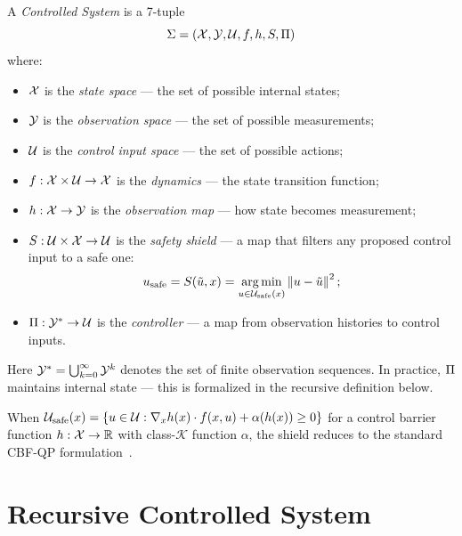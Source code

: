 \documentclass[11pt,a4paper]{article}
\begin{document}
\begin{definition}
\label{def:cs}
A \emph{Controlled System} is a 7-tuple
\begin{equation}
  \Sigma = (\mathcal{X}, \mathcal{Y}, \mathcal{U}, f, h, S, \Pi)
\end{equation}
where:
\begin{itemize}
  \item $\mathcal{X}$ is the \emph{state space} --- the set of possible internal states;
  \item $\mathcal{Y}$ is the \emph{observation space} --- the set of possible measurements;
  \item $\mathcal{U}$ is the \emph{control input space} --- the set of possible actions;
  \item $f : \mathcal{X} \times \mathcal{U} \to \mathcal{X}$ is the \emph{dynamics} --- the state
        transition function;
  \item $h : \mathcal{X} \to \mathcal{Y}$ is the \emph{observation map} --- how state becomes
        measurement;
  \item $S : \mathcal{U} \times \mathcal{X} \to \mathcal{U}$ is the \emph{safety shield} --- a map
        that filters any proposed control input to a safe one:
        \begin{equation}
          u_{\text{safe}} = S(\tilde{u}, x)
          = \operatorname*{arg\,min}_{u \in \mathcal{U}_{\text{safe}}(x)} \left\| u - \tilde{u} \right\|^2;
        \end{equation}
  \item $\Pi : \mathcal{Y}^* \to \mathcal{U}$ is the \emph{controller} --- a map from
        observation histories to control inputs.
\end{itemize}

Here $\mathcal{Y}^* = \bigcup_{k=0}^{\infty} \mathcal{Y}^k$ denotes the set of finite
observation sequences.  In practice, $\Pi$ maintains internal state --- this
is formalized in the recursive definition below.
\end{definition}

\begin{remark}
When $\mathcal{U}_{\text{safe}}(x) = \{u \in \mathcal{U} : \nabla_x h(x) \cdot f(x, u)
+ \alpha(h(x)) \geq 0\}$ for a control barrier function $h : \mathcal{X} \to \mathbb{R}$
with class-$\mathcal{K}$ function $\alpha$, the shield reduces to the
standard CBF-QP formulation~\cite{eslami2026control}.
\end{remark}


\section{Recursive Controlled System}
\label{sec:rcs}
\end{document}
